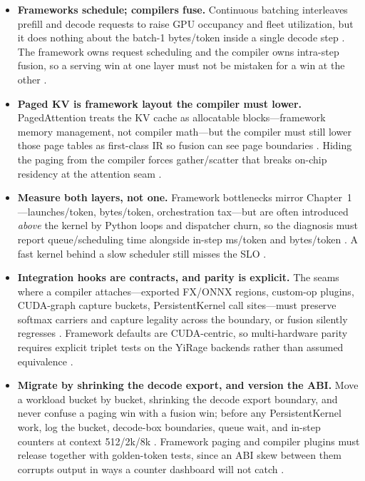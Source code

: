 \begin{itemize}
\item \textbf{Frameworks schedule; compilers fuse.}
Continuous batching interleaves prefill and decode requests to raise GPU occupancy and fleet utilization, but it does nothing about the batch-1 bytes/token inside a single decode step \citep{kwon2023vllm,patel2025llminference}. The framework owns request scheduling and the compiler owns intra-step fusion, so a serving win at one layer must not be mistaken for a win at the other \citep{taxbreak2026,memoryfloor2026}.

\item \textbf{Paged KV is framework layout the compiler must lower.}
PagedAttention treats the KV cache as allocatable blocks---framework memory management, not compiler math---but the compiler must still lower those page tables as first-class IR so fusion can see page boundaries \citep{kwon2023vllm,yirage2026}. Hiding the paging from the compiler forces gather/scatter that breaks on-chip residency at the attention seam \citep{chen2020compilerbasedhardw,patel2025llminference}.

\item \textbf{Measure both layers, not one.}
Framework bottlenecks mirror Chapter~1---launches/token, bytes/token, orchestration tax---but are often introduced \emph{above} the kernel by Python loops and dispatcher churn, so the diagnosis must report queue/scheduling time alongside in-step ms/token and bytes/token \citep{taxbreak2026,patel2025llminference}. A fast kernel behind a slow scheduler still misses the SLO \citep{memoryfloor2026,dlbook}.

\item \textbf{Integration hooks are contracts, and parity is explicit.}
The seams where a compiler attaches---exported FX/ONNX regions, custom-op plugins, CUDA-graph capture buckets, PersistentKernel call sites---must preserve softmax carriers and capture legality across the boundary, or fusion silently regresses \citep{dao2022flashattention,yirage2026,nvidia2024cudagraphs}. Framework defaults are CUDA-centric, so multi-hardware parity requires explicit triplet tests on the YiRage backends rather than assumed equivalence \citep{amd2024xdna,amd2024aie}.

\item \textbf{Migrate by shrinking the decode export, and version the ABI.}
Move a workload bucket by bucket, shrinking the decode export boundary, and never confuse a paging win with a fusion win; before any PersistentKernel work, log the bucket, decode-box boundaries, queue wait, and in-step counters at context 512/2k/8k \citep{kwon2023vllm,patel2025llminference}. Framework paging and compiler plugins must release together with golden-token tests, since an ABI skew between them corrupts output in ways a counter dashboard will not catch \citep{yirage2026,memoryfloor2026}.
\end{itemize}


